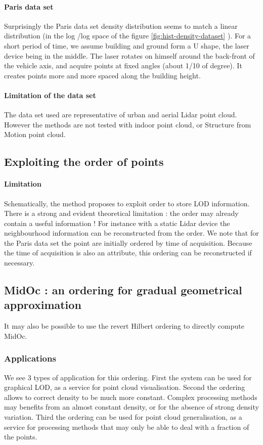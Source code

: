 		 \paragraph{Paris data set}
			 Surprisingly the Paris data set density distribution seems to match a linear distribution (in the log /log space of the figure \ref{fig:hist-density-dataset} ).
			 For a short period of time, we assume building and ground form a U shape, the laser device being in the middle. The laser rotates on himself around the back-front of the vehicle axis, and acquire points at fixed angles (about 1/10 of degree). It creates points more and more spaced along the building height.
			 
		 \paragraph{Limitation of the data set}
			 The data set used are representative of urban and aerial Lidar point cloud. However the methods are not tested with indoor point cloud, or Structure from Motion point cloud.
		 
	 \subsection{Exploiting the order of points}
		 \paragraph{Limitation}
			 Schematically, the method proposes to exploit order to store LOD information. There is a strong and evident theoretical limitation : the order may already contain a useful information !
			 For instance with a static Lidar device the neighbourhood information can be reconstructed from the order. We note that for the Paris data set the point are initially ordered by time of acquisition. Because the time of acquisition is also an attribute, this ordering can be reconstructed if necessary.
			 
	 \subsection{MidOc : an ordering for gradual geometrical approximation}
	 	It may also be possible to use the revert Hilbert ordering to directly compute MidOc.
	 	\subsubsection{Applications}
	 	We see 3 types of application for this ordering. First the system can be used for graphical LOD, as a service for point cloud visualisation. Second the ordering allows to correct density to be much more constant. Complex processing methods may benefits from an almost constant density, or for the absence of strong density variation. Third the ordering can be used for point cloud generalisation, as a service for processing methods that may only be able to deal with a fraction of the points.  
	 	
